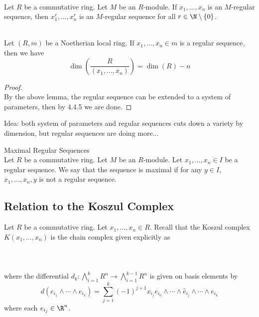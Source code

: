 \documentclass[a4paper]{article}
\begin{document}
\begin{lmm}{}{}\\
Let $R$ be a commutative ring. Let $M$ be an $R$-module. If $x_1,\dots,x_n$ is an $M$-regular sequence, then $x_1^r,\dots,x_n^r$ is an $M$-regular sequence for all $r\in\N\setminus\{0\}$. 
\end{lmm}

\begin{crl}{}{}\\
Let $(R,m)$ be a Noetherian local ring. If $x_1,\dots,x_n\in m$ is a regular sequence, then we have $$\dim\left(\frac{R}{(x_1,\dots,x_n)}\right)=\dim(R)-n$$
\begin{proof}\\
By the above lemma, the regular sequence can be extended to a system of parameters, then by 4.4.5 we are done. 
\end{proof}
\end{crl}

Idea: both system of parameters and regular sequences cuts down a variety by dimension, but regular sequences are doing more...


\begin{defn}{Maximal Regular Sequences}{}\\
Let $R$ be a commutative ring. Let $M$ be an $R$-module. Let $x_1,\dots,x_n\in I$ be a regular sequence. We say that the sequence is maximal if for any $y\in I$, $x_1,\dots,x_n,y$ is not a regular sequence. 
\end{defn}

\subsection{Relation to the Koszul Complex}
Let $R$ be a commutative ring. Let $x_1,\dots,x_n\in R$. Recall that the Koszul complex $K(x_1,\dots,x_n)$ is the chain complex given explicitly as \\~\\
\\~\\
where the differential $d_k:\bigwedge_{i=1}^kR^n\to\bigwedge_{i=1}^{k-1}R^n$ is given on basis elements by $$d(e_{i_1}\wedge\cdots\wedge e_{i_k})=\sum_{j=1}^k(-1)^{j+1}x_{i_j}e_{i_0}\wedge\cdots\wedge\hat{e}_{i_j}\wedge\cdots\wedge e_{i_k}$$ where each $e_{i_j}\in\R^n$. \\
\end{document}
